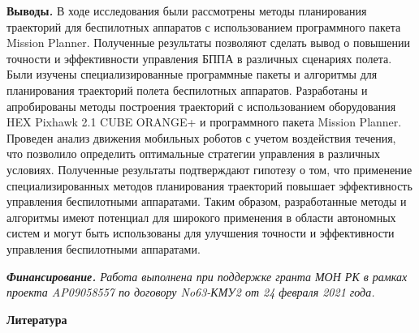 {\bfseries Выводы\emph{.}} В ходе исследования были рассмотрены методы
планирования траекторий для беспилотных аппаратов с использованием
программного пакета Mission Planner. Полученные результаты позволяют
сделать вывод о повышении точности и эффективности управления БППА в
различных сценариях полета. Были изучены специализированные программные
пакеты и алгоритмы для планирования траекторий полета беспилотных
аппаратов. Разработаны и апробированы методы построения траекторий с
использованием оборудования HEX Pixhawk 2.1 CUBE ORANGE+ и программного
пакета Mission Planner. Проведен анализ движения мобильных роботов с
учетом воздействия течения, что позволило определить оптимальные
стратегии управления в различных условиях. Полученные результаты
подтверждают гипотезу о том, что применение специализированных методов
планирования траекторий повышает эффективность управления беспилотными
аппаратами. Таким образом, разработанные методы и алгоритмы имеют
потенциал для широкого применения в области автономных систем и могут
быть использованы для улучшения точности и эффективности управления
беспилотными аппаратами.

\emph{{\bfseries Финансирование.} Работа выполнена при поддержке гранта МОН
РК в рамках проекта AP09058557 по договору No63-КМУ2 от 24 февраля 2021
года.}

{\bfseries Литература}

